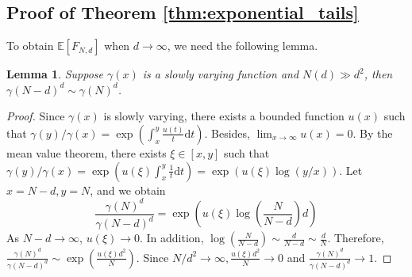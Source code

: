 \documentclass[conference,a4paper]{IEEEtran}
\def\E{\mathbb{E}}
\def\dd{\mathrm{d}}
\newtheorem{lemma}{Lemma}
\begin{document}
\subsection{Proof of Theorem \ref{thm:exponential_tails}}
To obtain $\E[F_{N,d}]$ when $d\to \infty$,
we need the following lemma.
\begin{lemma}\label{lem:ratio_epsilon}
     Suppose $\gamma(x)$ is a slowly varying function
     and $N(d)\gg d^2$,
     then $\gamma(N-d)^{d} \sim \gamma(N)^d$.
\end{lemma}
\begin{proof}
     Since $\gamma(x)$ is slowly varying, there exists
     a bounded function $u(x)$ such that
     $\gamma(y)/\gamma(x)=\exp(\int_{x}^y \frac{u(t)}{t}\dd t)$.
     Besides, $\lim_{x\to \infty} u(x) = 0$.
     By the mean value theorem, there exists $\xi \in [x,y]$ such that
     $\gamma(y)/\gamma(x)=\exp(u(\xi)\int_{x}^y \frac{1}{t}\dd t)
     =\exp(u(\xi)\log(y/x))$. Let $x=N-d, y=N$, and we obtain
     \begin{equation*}
          \frac{\gamma(N)^d}{\gamma(N-d)^d}
          = \exp \left(u(\xi) \log\left(\frac{N}{N-d} \right)d \right)
     \end{equation*}
     As $N-d\to \infty$, $u(\xi)\to 0$. In addition,
     $\log(\frac{N}{N-d}) \sim \frac{d}{N-d} \sim \frac{d}{N}$.
     Therefore,
     $\frac{\gamma(N)^d}{\gamma(N-d)^d}\sim \exp(\frac{u(\xi)d^2}{N})
     $. Since $N/d^2 \to \infty, \frac{u(\xi)d^2}{N} \to 0$ and
     $\frac{\gamma(N)^d}{\gamma(N-d)^d}\to 1$.
\end{proof}
\end{document}
